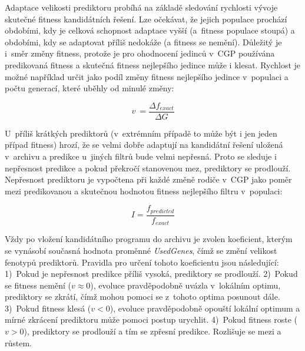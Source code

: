 \documentclass[czech]{ExcelAtFIT} %
\begin{document}
Adaptace velikosti prediktoru probíhá na základě sledování rychlosti vývoje skutečné fitness kan\-di\-dát\-ních ře\-šení. Lze očekávat, že jejich populace prochází ob\-do\-bími, kdy je celková schopnost adaptace vyšší (a~fitness populace stoupá) a obdobími, kdy se adaptovat příliš nedokáže (a fitness se nemění). Důležitý je i~směr změny fitness, protože je pro ohodnocení je\-dinců v~CGP používána predikovaná fitness a skutečná fitness nejlepšího jedince může i klesat. Rychlost je možné například určit jako podíl změny fitness nej\-lep\-šího jedince v~populaci a počtu generací, které uběhly od minulé změny:

\begin{equation}
    \label{eq:velocity}
    v~= \frac{\Delta{}f_{\mathit{exact}}}{\Delta{}G}
\end{equation}

U~příliš krátkých prediktorů (v~extrémním případě to může být i jen jeden případ fitness) hrozí, že se velmi dobře adaptují na kandidátní řešení uložená v~archivu a predikce u~jiných filtrů bude velmi nepřesná. Proto se sleduje i nepřesnost predikce a pokud překročí stanovenou mez, prediktory se prodlouží. Nepřesnost prediktoru je vypočtena při každé změně rodiče v~CGP jako poměr mezi predikovanou a skutečnou hodnotou fitness nejlepšího filtru v~populaci:

\begin{equation}
    \mathit{I} = \frac{f_{\mathit{predicted}}}{f_{\mathit{exact}}}
\end{equation}

Vždy po vložení kandidátního programu do archivu je zvolen koeficient, kterým se vynásobí současná hodnota proměnné \emph{UsedGenes}, čímž se změní velikost fenotypů prediktorů. Pravidla pro určení tohoto koeficientu jsou následující: 1)~Pokud je nepřesnost pre\-dikce příliš vysoká, pre\-dik\-to\-ry se prodlouží. 2)~Pokud se fitness nemění ($v \approx 0$), evoluce prav\-dě\-po\-dob\-ně uvázla v~lokálním op\-ti\-mu, pre\-dik\-tory se zkrátí, čímž mohou pomoci se z~tohoto op\-ti\-ma po\-su\-nout dále. 3)~Pokud fitness klesá ($v < 0$), evoluce prav\-dě\-po\-dobně opouští lokální optimum a mírné zkrácení prediktoru může pomoci postup urychlit. 4)~Pokud fitness roste ($v > 0$), prediktory se prodlouží a tím se zpřesní predikce. Rozlišuje se mezi  a  růstem.


\end{document}
